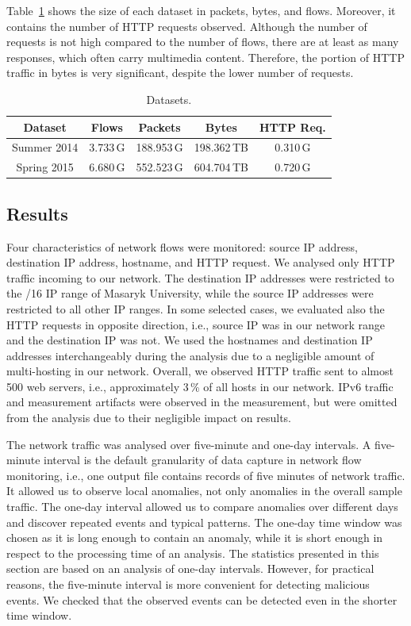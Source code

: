 Table~\ref{tab:httpsecurity-data-sets} shows the size of each dataset in packets, bytes, and flows. Moreover, it contains the number of HTTP requests observed. Although the number of requests is not high compared to the number of flows, there are at least as many responses, which often carry multimedia content. Therefore, the portion of HTTP traffic in bytes is very significant, despite the lower number of requests.

\begin{table}[ht]
\centering
\begin{tabular}{| c | c | c | c | c |} \hline
Dataset &  Flows & Packets & Bytes & HTTP Req.\\ \hline
Summer 2014 & 3.733\,G & 188.953\,G & 198.362\,TB & 0.310\,G \\ \hline
Spring 2015 & 6.680\,G & 552.523\,G & 604.704\,TB & 0.720\,G \\ \hline
\end{tabular}
\caption{Datasets.}
\label{tab:httpsecurity-data-sets}
\end{table}


\subsection{Results}\label{subsec:httpsecurity-results}

Four characteristics of network flows were monitored: source IP address, destination IP address, hostname, and HTTP request. We analysed only HTTP traffic incoming to our network. The destination IP addresses were restricted to the /16 IP range of Masaryk University, while the source IP addresses were restricted to all other IP ranges. In some selected cases, we evaluated also the HTTP requests in opposite direction, i.e., source IP was in our network range and the destination IP was not. We used the hostnames and destination IP addresses interchangeably during the analysis due to a negligible amount of multi-hosting in our network. Overall, we observed HTTP traffic sent to almost 500 web servers, i.e., approximately 3\,\% of all hosts in our network. IPv6 traffic and measurement artifacts were observed in the measurement, but were omitted from the analysis due to their negligible impact on results.

The network traffic was analysed over five-minute and one-day intervals. A five-minute interval is the default granularity of data capture in network flow monitoring, i.e., one output file contains records of five minutes of network traffic. It allowed us to observe local anomalies, not only anomalies in the overall sample traffic. The one-day interval allowed us to compare anomalies over different days and discover repeated events and typical patterns. The one-day time window was chosen as it is long enough to contain an anomaly, while it is short enough in respect to the processing time of an analysis. The statistics presented in this section are based on an analysis of one-day intervals. However, for practical reasons, the five-minute interval is more convenient for detecting malicious events. We checked that the observed events can be detected even in the shorter time window.

